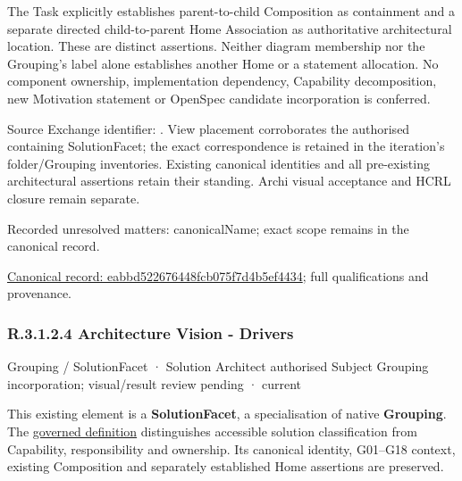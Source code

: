 The Task explicitly establishes parent-to-child Composition as containment and
a separate directed child-to-parent Home Association as authoritative architectural
location. These are distinct assertions. Neither diagram membership nor the
Grouping's label alone establishes another Home or a statement allocation.
No component ownership, implementation dependency, Capability decomposition,
new Motivation statement or OpenSpec candidate incorporation is conferred.



Source Exchange identifier: \texttt{}. View placement corroborates
the authorised containing SolutionFacet; the exact correspondence is retained in the
iteration's folder/Grouping inventories. Existing canonical identities and all
pre-existing architectural assertions retain their standing. Archi visual
acceptance and HCRL closure remain separate.


{\small Recorded unresolved matters: canonicalName; exact scope remains in the canonical record.}\par
{\footnotesize \href{../../../../../../../continuum/grouping/eabbd522676448fcb075f7d4b5ef4434.md}{Canonical record: eabbd522676448fcb075f7d4b5ef4434}; full qualifications and provenance.}\par
\subsubsection*{R.3.1.2.4 Architecture Vision - Drivers}
\label{navigation:R.3.1.2.4}

\label{element:dc8500b4e7eb4923884f54db99d10a88}
{\small Grouping / SolutionFacet · Solution Architect authorised Subject Grouping incorporation; visual/result review pending · current}\par

This existing element is a \textbf{SolutionFacet}, a specialisation of native
\textbf{Grouping}. The \href{\detokenize{../../../../../../../governance/continuum-representation.md#solutionfacet-classification--1119-candidate}}{governed definition}
distinguishes accessible solution classification from Capability, responsibility
and ownership. Its canonical identity, G01–G18 context, existing Composition
and separately established Home assertions are preserved.



